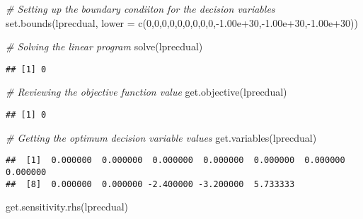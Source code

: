 \documentclass[
]{article}
\newenvironment{Shaded}{\begin{snugshade}}{\end{snugshade}}
\newcommand{\AttributeTok}[1]{\textcolor[rgb]{0.77,0.63,0.00}{#1}}
\newcommand{\CommentTok}[1]{\textcolor[rgb]{0.56,0.35,0.01}{\textit{#1}}}
\newcommand{\DecValTok}[1]{\textcolor[rgb]{0.00,0.00,0.81}{#1}}
\newcommand{\FloatTok}[1]{\textcolor[rgb]{0.00,0.00,0.81}{#1}}
\newcommand{\FunctionTok}[1]{\textcolor[rgb]{0.00,0.00,0.00}{#1}}
\newcommand{\NormalTok}[1]{#1}
\newcommand{\SpecialCharTok}[1]{\textcolor[rgb]{0.00,0.00,0.00}{#1}}
\begin{document}
\begin{Shaded}
\begin{Highlighting}[]
\CommentTok{\# Setting up the boundary condiiton for the decision variables}
\FunctionTok{set.bounds}\NormalTok{(lprecdual, }\AttributeTok{lower =} \FunctionTok{c}\NormalTok{(}\DecValTok{0}\NormalTok{,}\DecValTok{0}\NormalTok{,}\DecValTok{0}\NormalTok{,}\DecValTok{0}\NormalTok{,}\DecValTok{0}\NormalTok{,}\DecValTok{0}\NormalTok{,}\DecValTok{0}\NormalTok{,}\DecValTok{0}\NormalTok{,}\DecValTok{0}\NormalTok{,}\SpecialCharTok{{-}}\FloatTok{1.00e+30}\NormalTok{,}\SpecialCharTok{{-}}\FloatTok{1.00e+30}\NormalTok{,}\SpecialCharTok{{-}}\FloatTok{1.00e+30}\NormalTok{))}
\end{Highlighting}
\end{Shaded}

\begin{Shaded}
\begin{Highlighting}[]
\CommentTok{\# Solving the linear program}
\FunctionTok{solve}\NormalTok{(lprecdual)}
\end{Highlighting}
\end{Shaded}

\begin{verbatim}
## [1] 0
\end{verbatim}

\begin{Shaded}
\begin{Highlighting}[]
\CommentTok{\# Reviewing the objective function value}
\FunctionTok{get.objective}\NormalTok{(lprecdual)}
\end{Highlighting}
\end{Shaded}

\begin{verbatim}
## [1] 0
\end{verbatim}

\begin{Shaded}
\begin{Highlighting}[]
\CommentTok{\# Getting the optimum decision variable values}
\FunctionTok{get.variables}\NormalTok{(lprecdual)}
\end{Highlighting}
\end{Shaded}

\begin{verbatim}
##  [1]  0.000000  0.000000  0.000000  0.000000  0.000000  0.000000  0.000000
##  [8]  0.000000  0.000000 -2.400000 -3.200000  5.733333
\end{verbatim}

\begin{Shaded}
\begin{Highlighting}[]
\FunctionTok{get.sensitivity.rhs}\NormalTok{(lprecdual)}
\end{Highlighting}
\end{Shaded}
\end{document}
